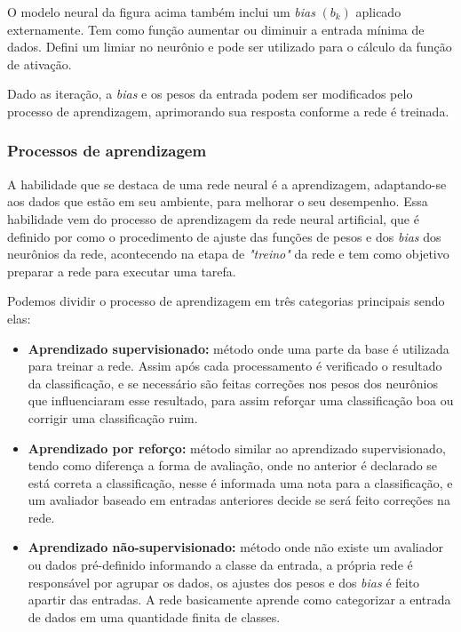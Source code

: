\par O modelo neural da figura acima também inclui um \textit{bias} $(b_k)$ aplicado externamente. Tem como função aumentar ou diminuir a entrada mínima de dados. Defini um limiar no neurônio e pode ser utilizado para o cálculo da função de ativação. 
\par Dado as iteração, a \textit{bias} e os pesos da entrada podem ser modificados pelo processo de aprendizagem, aprimorando sua resposta conforme a rede é treinada.  
\subsubsection{Processos de aprendizagem}
A habilidade que se destaca de uma rede neural é a aprendizagem, adaptando-se aos dados que estão em seu ambiente, para melhorar o seu desempenho. Essa habilidade vem do processo de aprendizagem da rede neural artificial, que é definido por \cite{Demuth:2014:NND:2721661} como o procedimento de ajuste das funções de pesos e dos \textit{bias} dos neurônios da rede, acontecendo na etapa de \textit{"treino"} da rede e tem como objetivo preparar a rede para executar uma tarefa. 
\par Podemos dividir o processo de aprendizagem em três categorias principais sendo elas:
\begin{itemize}
\item \textbf{Aprendizado supervisionado:} método onde uma parte da base é utilizada para treinar a rede. Assim após cada processamento é verificado o resultado da classificação, e se necessário são feitas correções nos pesos dos neurônios que influenciaram esse resultado, para assim reforçar uma classificação boa ou corrigir uma classificação ruim.
\item \textbf{Aprendizado por reforço:} método similar ao aprendizado supervisionado, tendo como diferença a forma de avaliação, onde no anterior é declarado se está correta a classificação, nesse é informada uma nota para a classificação, e um avaliador baseado em entradas anteriores decide se será feito correções na rede.
\item \textbf{Aprendizado não-supervisionado:} método onde não existe um avaliador ou dados pré-definido informando a classe da entrada, a própria rede é responsável por agrupar os dados, os ajustes dos pesos e dos \textit{bias} é feito apartir das entradas. A rede basicamente aprende como categorizar a entrada de dados em uma quantidade finita de classes. 
\end{itemize}	
